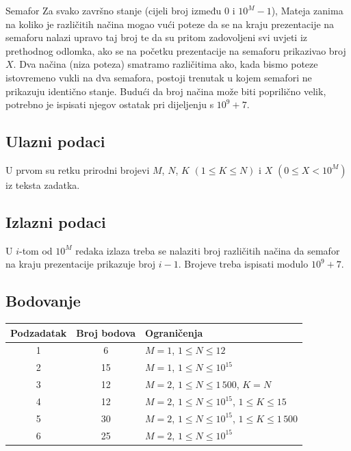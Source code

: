 \begin{statement}[
  problempoints=100,
  timelimit=5 sekundi,
  memorylimit=512 MiB,
]{Semafor}
Za svako završno stanje (cijeli broj između $0$ i $10^M-1$), Mateja zanima na
koliko je različitih načina mogao vući poteze da se na kraju prezentacije na
semaforu nalazi upravo taj broj te da su pritom zadovoljeni svi uvjeti iz
prethodnog odlomka, ako se na početku prezentacije na semaforu prikazivao
broj $X$. Dva načina (niza poteza) smatramo različitima ako, kada bismo
poteze istovremeno vukli na dva semafora, postoji trenutak u kojem semafori
ne prikazuju identično stanje. Budući da broj načina može biti poprilično
velik, potrebno je ispisati njegov ostatak pri dijeljenju s $10^9+7$.
\subsection*{Ulazni podaci}
U prvom su retku prirodni brojevi $M$, $N$, $K$ $(1 \le K \le N)$ i $X$ $(0
\le X < 10^M)$ iz teksta zadatka.

\subsection*{Izlazni podaci}
U $i$-tom od $10^M$ redaka izlaza treba se nalaziti broj različitih načina da
semafor na kraju prezentacije prikazuje broj $i-1$. Brojeve treba ispisati
modulo $10^9 + 7$.

\subsection*{Bodovanje}
{\renewcommand{\arraystretch}{1.4}
  \setlength{\tabcolsep}{6pt}
  \begin{tabular}{ccl}
 Podzadatak & Broj bodova & Ograničenja \\ \midrule
  1 & 6 & $M=1$, $1 \le N \le 12$ \\
  2 & 15 & $M=1$, $1 \le N \le 10^{15}$ \\
  3 & 12 & $M=2$, $1 \le N \le 1\,500$, $K = N$\\
  4 & 12 & $M=2$, $1 \le N \le 10^{15}$, $1 \le K \le 15$ \\
  5 & 30 & $M=2$, $1 \le N \le 10^{15}$, $1 \le K \le 1\,500$ \\
  6 & 25 & $M=2$, $1 \le N \le 10^{15}$ \\
\end{tabular}}


\end{statement}
